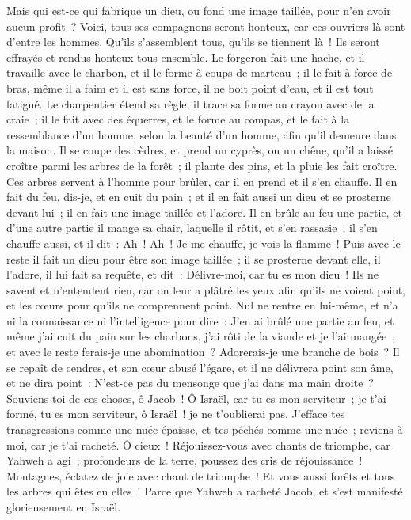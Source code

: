 \begin{multicols}{2}
Mais qui est-ce qui fabrique un dieu, ou fond une image taillée, pour n'en avoir aucun profit~?
Voici, tous ses compagnons seront honteux, car ces ouvriers-là sont d'entre les hommes. Qu'ils s'assemblent tous, qu'ils se tiennent là~! Ils seront effrayés et rendus honteux tous ensemble.
Le forgeron fait une hache, et il travaille avec le charbon, et il le forme à coups de marteau~; il le fait à force de bras, même il a faim et il est sans force, il ne boit point d'eau, et il est tout fatigué.
Le charpentier étend sa règle, il trace sa forme au crayon avec de la craie~; il le fait avec des équerres, et le forme au compas, et le fait à la ressemblance d'un homme, selon la beauté d'un homme, afin qu'il demeure dans la maison.
Il se coupe des cèdres, et prend un cyprès, ou un chêne, qu'il a laissé croître parmi les arbres de la forêt~; il plante des pins, et la pluie les fait croître.
Ces arbres servent à l'homme pour brûler, car il en prend et il s'en chauffe. Il en fait du feu, dis-je, et en cuit du pain~; et il en fait aussi un dieu et se prosterne devant lui~; il en fait une image taillée et l'adore.
Il en brûle au feu une partie, et d'une autre partie il mange sa chair, laquelle il rôtit, et s'en rassasie~; il s'en chauffe aussi, et il dit~: Ah~! Ah~! Je me chauffe, je vois la flamme~!
Puis avec le reste il fait un dieu pour être son image taillée~; il se prosterne devant elle, il l'adore, il lui fait sa requête, et dit~: Délivre-moi, car tu es mon dieu~!
Ils ne savent et n'entendent rien, car on leur a plâtré les yeux afin qu'ils ne voient point, et les cœurs pour qu'ils ne comprennent point.
Nul ne rentre en lui-même, et n'a ni la connaissance ni l'intelligence pour dire~: J'en ai brûlé une partie au feu, et même j'ai cuit du pain sur les charbons, j'ai rôti de la viande et je l'ai mangée~; et avec le reste ferais-je une abomination~? Adorerais-je une branche de bois~?
Il se repaît de cendres, et son cœur abusé l'égare, et il ne délivrera point son âme, et ne dira point~: N'est-ce pas du mensonge que j'ai dans ma main droite~?
Souviens-toi de ces choses, ô Jacob~! Ô Israël, car tu es mon serviteur~; je t'ai formé, tu es mon serviteur, ô Israël~! je ne t'oublierai pas.
J'efface tes transgressions comme une nuée épaisse, et tes péchés comme une nuée~; reviens à moi, car je t'ai racheté.
Ô cieux~! Réjouissez-vous avec chants de triomphe, car Yahweh a agi~; profondeurs de la terre, poussez des cris de réjouissance~! Montagnes, éclatez de joie avec chant de triomphe~! Et vous aussi forêts et tous les arbres qui êtes en elles~! Parce que Yahweh a racheté Jacob, et s'est manifesté glorieusement en Israël.

\end{multicols}
